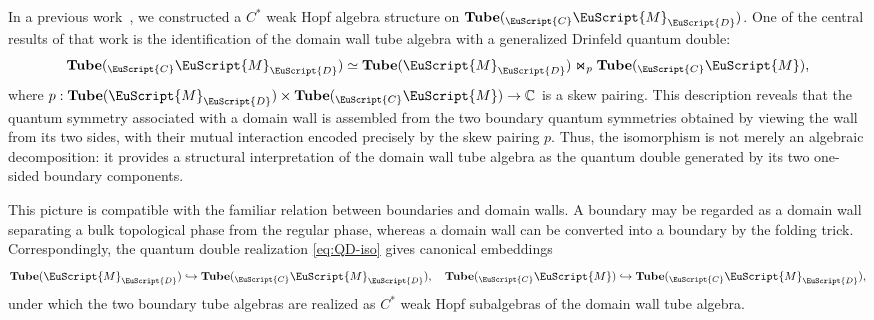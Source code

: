 \documentclass[a4paper,11pt]{article}
\theoremstyle{definition}
\theoremstyle{remark}
\newcommand\eC           {\EuScript{C}}
\newcommand\eD           {\EuScript{D}}
\newcommand\eM          {\EuScript{M}}
\begin{document}
In a previous work~\cite{jia2025tube}, we constructed a $C^*$ weak Hopf algebra structure on $\mathbf{Tube}({}_{\eC}\eM_{\eD})$. One of the central results of that work is the identification of the domain wall tube algebra with a generalized Drinfeld quantum double:
\begin{equation}
    \label{eq:QD-iso}
    \mathbf{Tube}({}_{\eC}\eM_{\eD}) \simeq \mathbf{Tube}(\eM_{\eD}) \Join_p \mathbf{Tube}({}_{\eC}\eM),
\end{equation}
where $p:\mathbf{Tube}(\eM_{\eD})\times \mathbf{Tube}({}_{\eC}\eM) \to \mathbb{C}$ is a skew pairing. This description reveals that the quantum symmetry associated with a domain wall is assembled from the two boundary quantum symmetries obtained by viewing the wall from its two sides, with their mutual interaction encoded precisely by the skew pairing $p$. Thus, the isomorphism is not merely an algebraic decomposition: it provides a structural interpretation of the domain wall tube algebra as the quantum double generated by its two one-sided boundary
components.

This picture is compatible with the familiar relation between boundaries and domain walls. A boundary may be regarded as a domain wall separating a bulk topological phase from the regular phase, whereas a domain wall can be converted into a boundary by the folding trick. Correspondingly, the quantum double realization \eqref{eq:QD-iso} gives canonical embeddings
\begin{equation}
    \notag
    \mathbf{Tube}(\eM_{\eD}) \hookrightarrow \mathbf{Tube}({}_{\eC}\eM_{\eD}), \quad \mathbf{Tube}({}_{\eC}\eM) \hookrightarrow \mathbf{Tube}({}_{\eC}\eM_{\eD}),
\end{equation}
under which the two boundary tube algebras are realized as $C^*$ weak Hopf subalgebras of the domain wall tube algebra.
\end{document}
